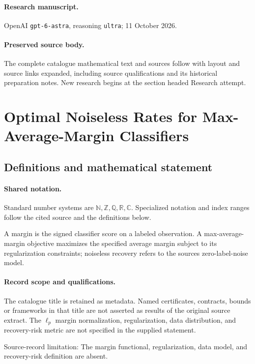 \documentclass[11pt]{article}
\begin{document}
\paragraph{Research manuscript.} OpenAI \texttt{gpt-6-astra}, reasoning \texttt{ultra}; 11 October 2026.
\paragraph{Preserved source body.} The complete catalogue mathematical text and sources follow with layout and source links expanded, including source qualifications and its historical preparation notes. New research begins at the section headed Research attempt.

\section{Optimal Noiseless Rates for Max-Average-Margin Classifiers}\label{statement}

\subsection{Definitions and mathematical statement}

\paragraph{Shared notation.}Standard number systems are $\mathbb N,\mathbb Z,\mathbb Q,\mathbb R,\mathbb C$. Specialized notation and index ranges follow the cited source and the definitions below.


A margin is the signed classifier score on a labeled observation. A max-average-margin objective maximizes the specified average margin subject to its regularization constraints; noiseless recovery refers to the source\textquotesingle s zero-label-noise model.
\paragraph{Record scope and qualifications.}
The catalogue title is retained as metadata. Named certificates, contracts, bounds or frameworks in that title are not asserted as results of the original source extract.
The $\ell_p$ margin normalization, regularization, data distribution, and recovery-risk metric are not specified in the supplied statement.

Source-record limitation: The margin functional, regularization, data model, and recovery-risk definition are absent.
\end{document}
